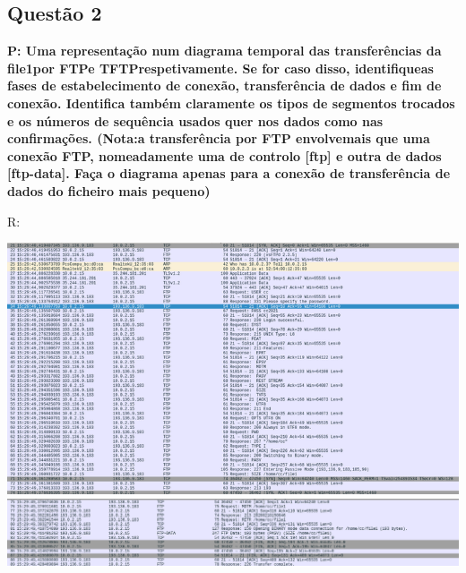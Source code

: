 \documentclass[a4paper]{article}
\begin{document}
\newpage

	\subsection{ Questão 2}
\textbf {P: Uma representação num diagrama temporal das transferências da file1por FTPe TFTPrespetivamente. Se for caso disso, identifiqueas fases de estabelecimento de conexão, transferência de dados e fim de conexão. Identifica também claramente os tipos de segmentos trocados e os números de sequência usados quer nos dados como nas confirmações. (Nota:a transferência por FTP envolvemais que uma conexão FTP, nomeadamente uma de controlo [ftp] e outra de dados [ftp-data]. Faça o diagrama apenas para a conexão de transferência de dados do ficheiro mais pequeno)\\}

R:

\begin{center}
	\includegraphics[scale=0.6]{images/ftp1.1}
	\includegraphics[scale=0.3]{images/ftp1.2}
\end{center}
\end{document}
